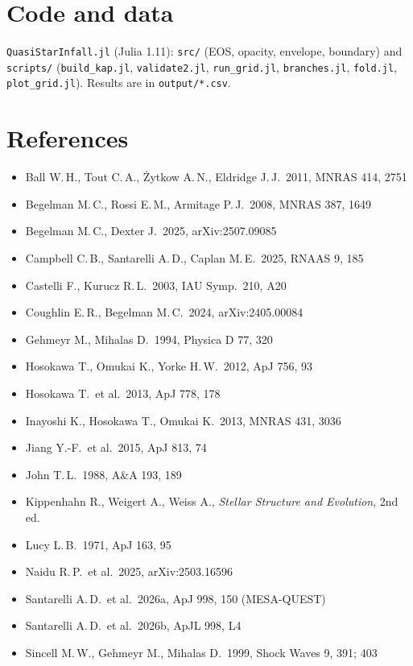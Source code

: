 \documentclass[11pt]{article}
\begin{document}
\section*{Code and data}\sloppy
\texttt{QuasiStarInfall.jl} (Julia 1.11): \texttt{src/} (EOS, opacity, envelope, boundary) and \texttt{scripts/}
(\texttt{build\_kap.jl}, \texttt{validate2.jl}, \texttt{run\_grid.jl}, \texttt{branches.jl}, \texttt{fold.jl}, \texttt{plot\_grid.jl}).
Results are in \texttt{output/*.csv}.

\section*{References}
{\small
\begin{itemize}[leftmargin=*,label={}]
\item Ball W.\,H., Tout C.\,A., \.Zytkow A.\,N., Eldridge J.\,J.\ 2011, MNRAS 414, 2751
\item Begelman M.\,C., Rossi E.\,M., Armitage P.\,J.\ 2008, MNRAS 387, 1649
\item Begelman M.\,C., Dexter J.\ 2025, arXiv:2507.09085
\item Campbell C.\,B., Santarelli A.\,D., Caplan M.\,E.\ 2025, RNAAS 9, 185
\item Castelli F., Kurucz R.\,L.\ 2003, IAU Symp.\ 210, A20
\item Coughlin E.\,R., Begelman M.\,C.\ 2024, arXiv:2405.00084
\item Gehmeyr M., Mihalas D.\ 1994, Physica D 77, 320
\item Hosokawa T., Omukai K., Yorke H.\,W.\ 2012, ApJ 756, 93
\item Hosokawa T.\ et al.\ 2013, ApJ 778, 178
\item Inayoshi K., Hosokawa T., Omukai K.\ 2013, MNRAS 431, 3036
\item Jiang Y.-F.\ et al.\ 2015, ApJ 813, 74
\item John T.\,L.\ 1988, A\&A 193, 189
\item Kippenhahn R., Weigert A., Weiss A., \emph{Stellar Structure and Evolution}, 2nd ed.
\item Lucy L.\,B.\ 1971, ApJ 163, 95
\item Naidu R.\,P.\ et al.\ 2025, arXiv:2503.16596
\item Santarelli A.\,D.\ et al.\ 2026a, ApJ 998, 150 (MESA-QUEST)
\item Santarelli A.\,D.\ et al.\ 2026b, ApJL 998, L4
\item Sincell M.\,W., Gehmeyr M., Mihalas D.\ 1999, Shock Waves 9, 391; 403
\end{itemize}}
\end{document}
